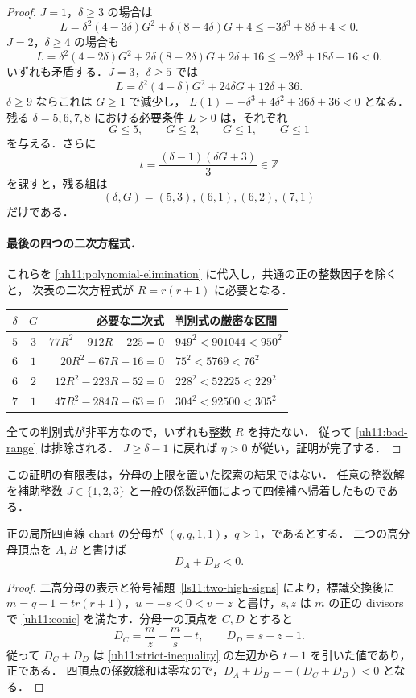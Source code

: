 \begin{proof}
$J=1$，$\delta\geq3$ の場合は
\[
 L=\delta^2(4-3\delta)G^2+\delta(8-4\delta)G+4
   \leq-3\delta^3+8\delta+4<0.
\]
$J=2$，$\delta\geq4$ の場合も
\[
 L=\delta^2(4-2\delta)G^2+2\delta(8-2\delta)G+2\delta+16
   \leq-2\delta^3+18\delta+16<0.
\]
いずれも矛盾する．$J=3$，$\delta\geq5$ では
\[
 L=\delta^2(4-\delta)G^2+24\delta G+12\delta+36.
\]
$\delta\geq9$ ならこれは $G\geq1$ で減少し，
$L(1)=-\delta^3+4\delta^2+36\delta+36<0$ となる．
残る $\delta=5,6,7,8$ における必要条件 $L>0$ は，それぞれ
\[
 G\leq5,\qquad G\leq2,\qquad G\leq1,\qquad G\leq1
\]
を与える．さらに
\[
 t=\frac{(\delta-1)(\delta G+3)}{3}\in\mathbb Z
\]
を課すと，残る組は
\[
 (\delta,G)=(5,3),(6,1),(6,2),(7,1)
\]
だけである．

\paragraph{最後の四つの二次方程式．}
これらを \eqref{uh11:polynomial-elimination} に代入し，共通の正の整数因子を除くと，
次表の二次方程式が $R=r(r+1)$ に必要となる．
\begin{center}
\small
\begin{tabular}{ccrl}
$\delta$ & $G$ & 必要な二次式 & 判別式の厳密な区間 \\
\hline
$5$ & $3$ & $77R^2-912R-225=0$ & $949^2<901044<950^2$ \\
$6$ & $1$ & $20R^2-67R-16=0$ & $75^2<5769<76^2$ \\
$6$ & $2$ & $12R^2-223R-52=0$ & $228^2<52225<229^2$ \\
$7$ & $1$ & $47R^2-284R-63=0$ & $304^2<92500<305^2$
\end{tabular}
\end{center}
全ての判別式が非平方なので，いずれも整数 $R$ を持たない．
従って \eqref{uh11:bad-range} は排除される．
$J\geq\delta-1$ に戻れば $\eta>0$ が従い，証明が完了する．
\end{proof}

この証明の有限表は，分母の上限を置いた探索の結果ではない．
任意の整数解を補助整数 $J\in\{1,2,3\}$ と一般の係数評価によって四候補へ帰着したものである．

\begin{corollary}\label{uh11:two-negative}
正の局所四直線 chart の分母が $(q,q,1,1)$，$q>1$，であるとする．
二つの高分母頂点を $A,B$ と書けば
\[
 D_A+D_B<0.
\]
\end{corollary}

\begin{proof}
二高分母の表示と符号補題~\ref{ls11:two-high-signs} により，標識交換後に
$m=q-1=tr(r+1)$，$u=-s<0<v=z$ と書け，$s,z$ は $m$ の正の divisors で
\eqref{uh11:conic} を満たす．分母一の頂点を $C,D$ とすると
\[
 D_C=\frac mz-\frac ms-t,\qquad D_D=s-z-1.
\]
従って $D_C+D_D$ は \eqref{uh11:strict-inequality} の左辺から $t+1$ を引いた値であり，正である．
四頂点の係数総和は零なので，$D_A+D_B=-(D_C+D_D)<0$ となる．
\end{proof}
